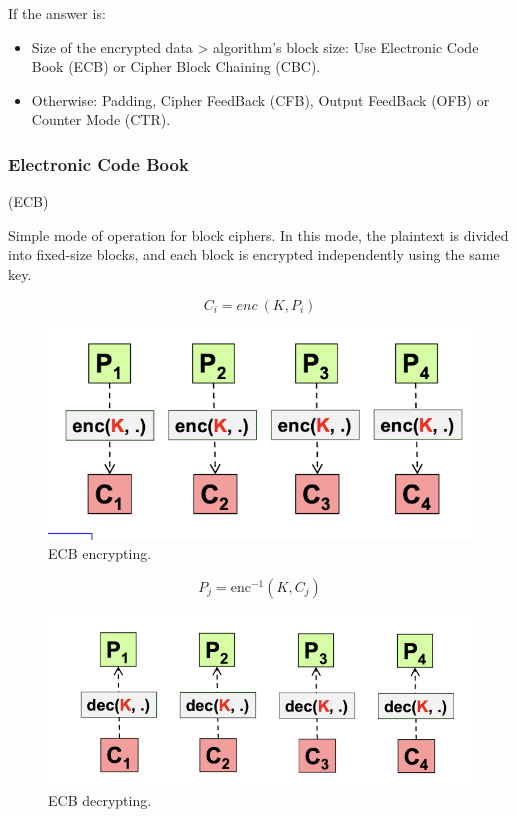 If the answer is:
\begin{itemize}
    \item Size of the encrypted data > algorithm's block size: Use Electronic Code Book (ECB) or Cipher Block Chaining (CBC).
    \item Otherwise: Padding, Cipher FeedBack (CFB), Output FeedBack (OFB) or Counter Mode (CTR).
\end{itemize}

\subsubsection{Electronic Code Book}
\begin{center}
    (ECB)
\end{center}

Simple mode of operation for block ciphers. In this mode, the plaintext is divided into fixed-size blocks, and each block is encrypted independently using the same key.

\begin{multicols}{2}
    \begin{equation*}
        \boxed{C_i = enc \ (K, P_i)}
    \end{equation*}
    \begin{figure}[H]
        \includegraphics[width=\linewidth]{Images/Cryptography/ECBEncrypt.png}
        \caption{ECB encrypting.}
    \end{figure}
    \columnbreak
    \begin{equation*}
        \boxed{P_j = \text{enc}^{-1}(K, C_j)}
    \end{equation*}
    \begin{figure}[H]
        \includegraphics[width=\linewidth]{Images/Cryptography/ECBDecrypt.png}
        \caption{ECB decrypting.}
    \end{figure}
\end{multicols}

